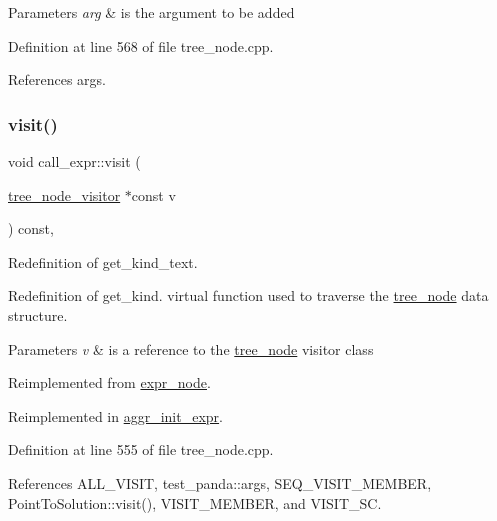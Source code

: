 \begin{DoxyParams}{Parameters}
{\em arg} & is the argument to be added \\
\hline
\end{DoxyParams}


Definition at line 568 of file tree\+\_\+node.\+cpp.



References args.

\mbox{\label{structcall__expr_aeb0867ff82c5d47f5f86dd4e149f398f}} 
\subsubsection{\texorpdfstring{visit()}{visit()}}
{\footnotesize\ttfamily void call\+\_\+expr\+::visit (\begin{DoxyParamCaption}\item[{\hyperlink{classtree__node__visitor}{tree\+\_\+node\+\_\+visitor} $\ast$const}]{v }\end{DoxyParamCaption}) const\hspace{0.3cm}{\ttfamily [override]}, {\ttfamily [virtual]}}



Redefinition of get\+\_\+kind\+\_\+text. 

Redefinition of get\+\_\+kind. virtual function used to traverse the \hyperlink{classtree__node}{tree\+\_\+node} data structure. 
\begin{DoxyParams}{Parameters}
{\em v} & is a reference to the \hyperlink{classtree__node}{tree\+\_\+node} visitor class \\
\hline
\end{DoxyParams}


Reimplemented from \hyperlink{structexpr__node_aac767878f13ca07371dde2c3938ef38a}{expr\+\_\+node}.



Reimplemented in \hyperlink{structaggr__init__expr_af28d5b47d09253a4ab8b59fbf776369d}{aggr\+\_\+init\+\_\+expr}.



Definition at line 555 of file tree\+\_\+node.\+cpp.



References A\+L\+L\+\_\+\+V\+I\+S\+IT, test\+\_\+panda\+::args, S\+E\+Q\+\_\+\+V\+I\+S\+I\+T\+\_\+\+M\+E\+M\+B\+ER, Point\+To\+Solution\+::visit(), V\+I\+S\+I\+T\+\_\+\+M\+E\+M\+B\+ER, and V\+I\+S\+I\+T\+\_\+\+SC.




